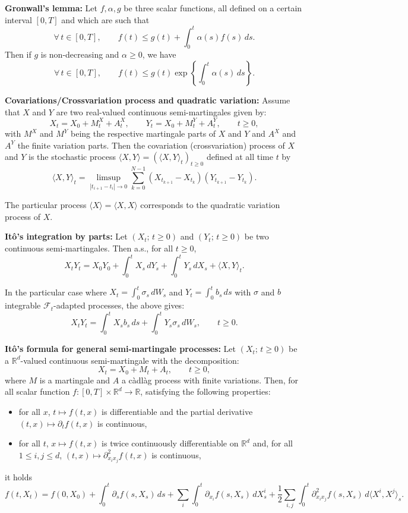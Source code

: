 \documentclass[11pt]{article}
\theoremstyle{remark}
\begin{document}
\noindent\textbf{Gronwall's lemma:}
Let $f,\alpha,g$ be three scalar functions, all defined on a certain interval $[0,T]$ and which are such that
\[
\forall\, t\in[0,T], \qquad f(t)\le g(t)+\int_0^t \alpha(s)f(s)\,ds.
\]
Then if $g$ is non-decreasing and $\alpha\ge0$, we have
\[
\forall\, t\in[0,T], \qquad f(t)\le g(t)\exp\left\{\int_0^t \alpha(s)\,ds\right\}.
\]

\noindent\textbf{Covariations/Crossvariation process and quadratic variation:}
Assume that $X$ and $Y$ are two real-valued continuous semi-martingales given by:
\[
X_t=X_0+M_t^X+A_t^X,\qquad Y_t=X_0+M_t^Y+A_t^Y,\qquad t\ge0,
\]
with $M^X$ and $M^Y$ being the respective martingale parts of $X$ and $Y$ and $A^X$ and $A^Y$ the finite variation parts.
Then the covariation (crossvariation) process of $X$ and $Y$ is the stochastic process $\langle X,Y\rangle=(\langle X,Y\rangle_t)_{t\ge0}$ defined at all time $t$ by
\[
\langle X,Y\rangle_t=\limsup_{|t_{i+1}-t_i|\to0}\sum_{k=0}^{N-1}(X_{t_{k+1}}-X_{t_k})(Y_{t_{k+1}}-Y_{t_k}).
\]

The particular process $\langle X\rangle=\langle X,X\rangle$ corresponds to the quadratic variation process of $X$.

\noindent\textbf{It\^o's integration by parts:}
Let $(X_t;\,t\ge0)$ and $(Y_t;\,t\ge0)$ be two continuous semi-martingales. Then a.s., for all $t\ge0$,
\[
X_tY_t=X_0Y_0+\int_0^t X_s\,dY_s+\int_0^t Y_s\,dX_s+\langle X,Y\rangle_t.
\]

In the particular case where $X_t=\int_0^t \sigma_s\,dW_s$ and $Y_t=\int_0^t b_s\,ds$ with $\sigma$ and $b$ integrable $\mathcal{F}_t$-adapted processes, the above gives:
\[
X_tY_t=\int_0^t X_sb_s\,ds+\int_0^t Y_s\sigma_s\,dW_s,\qquad t\ge0.
\]

\noindent\textbf{It\^o's formula for general semi-martingale processes:}
Let $(X_t;\,t\ge0)$ be a $\mathbb{R}^d$-valued continuous semi-martingale with the decomposition:
\[
X_t=X_0+M_t+A_t,\qquad t\ge0,
\]
where $M$ is a martingale and $A$ a c\`adl\`ag process with finite variations. Then, for all scalar function
$f:[0,T]\times\mathbb{R}^d\to\mathbb{R}$, satisfying the following properties:
\begin{itemize}
\item for all $x$, $t\mapsto f(t,x)$ is differentiable and the partial derivative $(t,x)\mapsto \partial_t f(t,x)$ is continuous,
\item for all $t$, $x\mapsto f(t,x)$ is twice continuously differentiable on $\mathbb{R}^d$ and, for all $1\le i,j\le d$, $(t,x)\mapsto \partial_{x_i x_j}^2 f(t,x)$ is continuous,
\end{itemize}
it holds
\[
f(t,X_t)=f(0,X_0)+\int_0^t \partial_s f(s,X_s)\,ds+\sum_i\int_0^t \partial_{x_i}f(s,X_s)\,dX_s^i+\frac{1}{2}\sum_{i,j}\int_0^t \partial_{x_i x_j}^2 f(s,X_s)\,d\langle X^i,X^j\rangle_s.
\]
\end{document}
